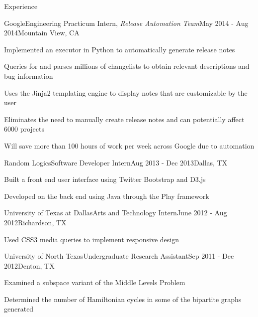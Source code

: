\documentclass{resume} %
\begin{document}
\begin{rSection}{Experience}

\begin{job_section}{Google}{Engineering Practicum Intern, {\em Release Automation Team}}{May 2014 - Aug 2014}{Mountain View, CA}
\item Implemented an executor in Python to automatically generate release notes
\item Queries for and parses millions of changelists to obtain relevant descriptions and bug information
\item Uses the Jinja2 templating engine to display notes that are customizable by the user
\item Eliminates the need to manually create release notes and can potentially affect 6000 projects
\item Will save more than 100 hours of work per week across Google due to automation
\end{job_section}

\begin{job_section}{Random Logics}{Software Developer Intern}{Aug 2013 - Dec 2013}{Dallas, TX}
\item Built a front end user interface using Twitter Bootstrap and D3.js
\item Developed on the back end using Java through the Play framework
\end{job_section}

\begin{job_section}{University of Texas at Dallas}{Arts and Technology Intern}{June 2012 - Aug 2012}{Richardson, TX}
\item Used CSS3 media queries to implement responsive design
\end{job_section}

\begin{job_section}{University of North Texas}{Undergraduate Research Assistant}{Sep 2011 - Dec 2012}{Denton, TX}
\item Examined a subspace variant of the Middle Levels Problem
\item Determined the number of Hamiltonian cycles in some of the bipartite graphs generated
\end{job_section}

\end{rSection}

\end{document}
